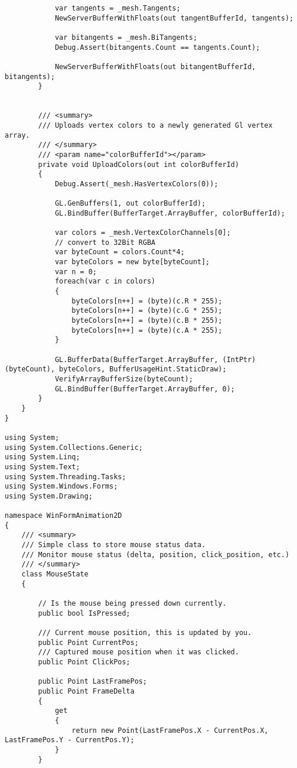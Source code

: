 \begin{scriptsize}
\begin{verbatim}
            var tangents = _mesh.Tangents;
            NewServerBufferWithFloats(out tangentBufferId, tangents);

            var bitangents = _mesh.BiTangents;
            Debug.Assert(bitangents.Count == tangents.Count);

            NewServerBufferWithFloats(out bitangentBufferId, bitangents);
        }


        /// <summary>
        /// Uploads vertex colors to a newly generated Gl vertex array.
        /// </summary>
        /// <param name="colorBufferId"></param>
        private void UploadColors(out int colorBufferId)
        {
            Debug.Assert(_mesh.HasVertexColors(0));

            GL.GenBuffers(1, out colorBufferId);
            GL.BindBuffer(BufferTarget.ArrayBuffer, colorBufferId);

            var colors = _mesh.VertexColorChannels[0];
            // convert to 32Bit RGBA
            var byteCount = colors.Count*4;
            var byteColors = new byte[byteCount];
            var n = 0;
            foreach(var c in colors)
            {
                byteColors[n++] = (byte)(c.R * 255);
                byteColors[n++] = (byte)(c.G * 255);
                byteColors[n++] = (byte)(c.B * 255);
                byteColors[n++] = (byte)(c.A * 255);
            }

            GL.BufferData(BufferTarget.ArrayBuffer, (IntPtr)(byteCount), byteColors, BufferUsageHint.StaticDraw);
            VerifyArrayBufferSize(byteCount);
            GL.BindBuffer(BufferTarget.ArrayBuffer, 0);
        }       
    }
}

using System;
using System.Collections.Generic;
using System.Linq;
using System.Text;
using System.Threading.Tasks;
using System.Windows.Forms;
using System.Drawing;

namespace WinFormAnimation2D
{
    /// <summary>
    /// Simple class to store mouse status data.
    /// Monitor mouse status (delta, position, click_position, etc.) 
    /// </summary>
    class MouseState
    {

        // Is the mouse being pressed down currently.
        public bool IsPressed;

        /// Current mouse position, this is updated by you.
        public Point CurrentPos;
        /// Captured mouse position when it was clicked.
        public Point ClickPos;

        public Point LastFramePos;
        public Point FrameDelta
        {
            get
            {
                return new Point(LastFramePos.X - CurrentPos.X, LastFramePos.Y - CurrentPos.Y);
            }
        }


\end{verbatim}
\end{scriptsize}
